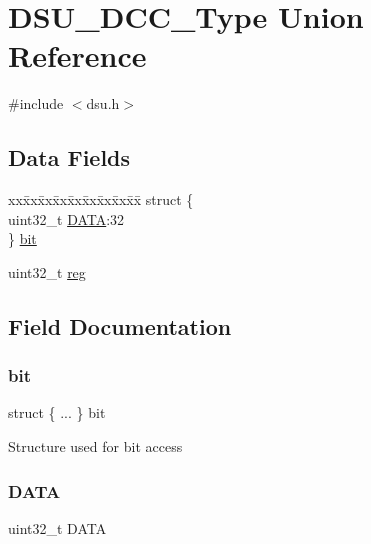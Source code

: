 \hypertarget{union_d_s_u___d_c_c___type}{}\section{D\+S\+U\+\_\+\+D\+C\+C\+\_\+\+Type Union Reference}
\label{union_d_s_u___d_c_c___type}


{\ttfamily \#include $<$dsu.\+h$>$}

\subsection*{Data Fields}
\begin{DoxyCompactItemize}
\item 
\begin{tabbing}
xx\=xx\=xx\=xx\=xx\=xx\=xx\=xx\=xx\=\kill
struct \{\\
\>uint32\_t \mbox{\hyperlink{union_d_s_u___d_c_c___type_aad20077939fb7b9e145416f55028ea37}{DATA}}:32\\
\} \mbox{\hyperlink{union_d_s_u___d_c_c___type_ad52d2bd8c77555fd7a1051bae3986fe6}{bit}}\\

\end{tabbing}\item 
uint32\+\_\+t \mbox{\hyperlink{union_d_s_u___d_c_c___type_a6b91636401516a477989a336376d7b40}{reg}}
\end{DoxyCompactItemize}


\subsection{Field Documentation}
\mbox{\label{union_d_s_u___d_c_c___type_ad52d2bd8c77555fd7a1051bae3986fe6}} 
\subsubsection{\texorpdfstring{bit}{bit}}
{\footnotesize\ttfamily struct \{ ... \}   bit}

Structure used for bit access \mbox{\label{union_d_s_u___d_c_c___type_aad20077939fb7b9e145416f55028ea37}} 
\subsubsection{\texorpdfstring{DATA}{DATA}}
{\footnotesize\ttfamily uint32\+\_\+t D\+A\+TA}

